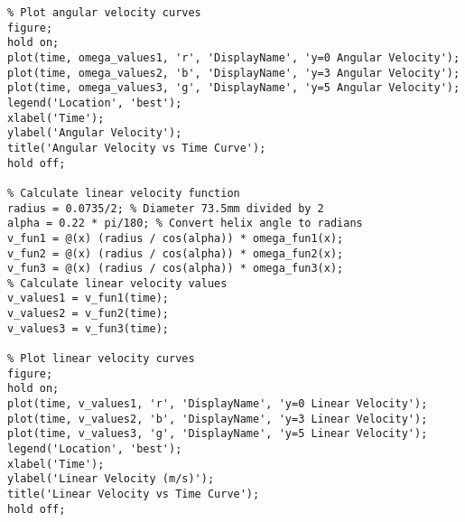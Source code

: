 \documentclass{mcmthesis}  %
\begin{document}
\begin{appendices}
\begin{verbatim}
% Plot angular velocity curves
figure;
hold on;
plot(time, omega_values1, 'r', 'DisplayName', 'y=0 Angular Velocity');
plot(time, omega_values2, 'b', 'DisplayName', 'y=3 Angular Velocity');
plot(time, omega_values3, 'g', 'DisplayName', 'y=5 Angular Velocity');
legend('Location', 'best');
xlabel('Time');
ylabel('Angular Velocity');
title('Angular Velocity vs Time Curve');
hold off;

% Calculate linear velocity function
radius = 0.0735/2; % Diameter 73.5mm divided by 2
alpha = 0.22 * pi/180; % Convert helix angle to radians
v_fun1 = @(x) (radius / cos(alpha)) * omega_fun1(x);
v_fun2 = @(x) (radius / cos(alpha)) * omega_fun2(x);
v_fun3 = @(x) (radius / cos(alpha)) * omega_fun3(x);
% Calculate linear velocity values
v_values1 = v_fun1(time);
v_values2 = v_fun2(time);
v_values3 = v_fun3(time);

% Plot linear velocity curves
figure;
hold on;
plot(time, v_values1, 'r', 'DisplayName', 'y=0 Linear Velocity');
plot(time, v_values2, 'b', 'DisplayName', 'y=3 Linear Velocity');
plot(time, v_values3, 'g', 'DisplayName', 'y=5 Linear Velocity');
legend('Location', 'best');
xlabel('Time');
ylabel('Linear Velocity (m/s)');
title('Linear Velocity vs Time Curve');
hold off;
\end{verbatim}

\end{appendices}  %
\end{document}
